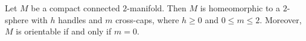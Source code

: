 Let $M$ be a compact connected $2$-manifold. Then $M$ is homeomorphic to a $2$-sphere with $h$ handles and $m$ cross-caps, where $h \geqslant 0$ and $0 \leqslant m \leqslant 2$. Moreover, $M$ is orientable if and only if $m = 0$.
